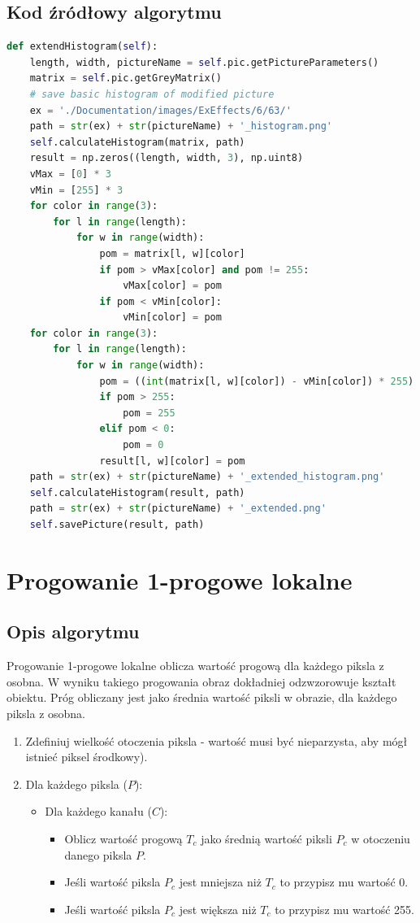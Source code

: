 \documentclass[a4paper,12pt, titlepage]{report}
\begin{document}
\subsection*{Kod źródłowy algorytmu}
\begin{lstlisting}[language=Python]
def extendHistogram(self):
    length, width, pictureName = self.pic.getPictureParameters()
    matrix = self.pic.getGreyMatrix()
    # save basic histogram of modified picture
    ex = './Documentation/images/ExEffects/6/63/'
    path = str(ex) + str(pictureName) + '_histogram.png'
    self.calculateHistogram(matrix, path)
    result = np.zeros((length, width, 3), np.uint8)
    vMax = [0] * 3
    vMin = [255] * 3
    for color in range(3):
        for l in range(length):
            for w in range(width):
                pom = matrix[l, w][color]
                if pom > vMax[color] and pom != 255:
                    vMax[color] = pom
                if pom < vMin[color]:
                    vMin[color] = pom
    for color in range(3):
        for l in range(length):
            for w in range(width):
                pom = ((int(matrix[l, w][color]) - vMin[color]) * 255) / (vMax[color] - vMin[color])
                if pom > 255:
                    pom = 255
                elif pom < 0:
                    pom = 0
                result[l, w][color] = pom
    path = str(ex) + str(pictureName) + '_extended_histogram.png'
    self.calculateHistogram(result, path)
    path = str(ex) + str(pictureName) + '_extended.png'
    self.savePicture(result, path)
\end{lstlisting}

\section{Progowanie 1-progowe lokalne}
\subsection*{Opis algorytmu}
\par Progowanie 1-progowe lokalne oblicza wartość progową dla każdego piksla z osobna. W wyniku takiego progowania obraz dokładniej odzwzorowuje kształt obiektu. Próg obliczany jest jako średnia wartość piksli w obrazie, dla każdego piksla z osobna.
\begin{enumerate}
\item Zdefiniuj wielkość otoczenia piksla - wartość musi być nieparzysta, aby mógł istnieć piksel środkowy).
\item Dla każdego piksla (\(P\)):
\begin{itemize}
\item Dla każdego kanału (\(C\)):
\begin{itemize}
\item Oblicz wartość progową \(T_{c}\) jako średnią wartość piksli \(P_{c}\) w otoczeniu danego piksla \(P\).
\item Jeśli wartość piksla \(P_{c}\) jest mniejsza niż \(T_{c}\) to przypisz mu wartość 0.
\item Jeśli wartość piksla \(P_{c}\) jest większa niż \(T_{c}\) to przypisz mu wartość 255.
\end{itemize}
\end{itemize}
\end{enumerate}
\end{document}
